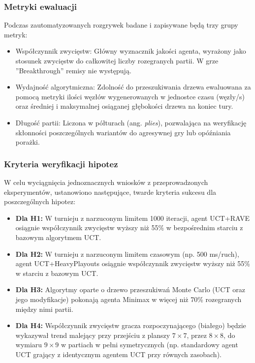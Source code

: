 \documentclass{article}
\begin{document}
\subsubsection{Metryki ewaluacji}
Podczas zautomatyzowanych rozgrywek badane i zapisywane będą trzy grupy metryk:
\begin{itemize}
    \item Współczynnik zwycięstw: Główny wyznacznik jakości agenta, wyrażony jako stosunek zwycięstw do całkowitej liczby rozegranych partii. W grze ''Breakthrough'' remisy nie występują.
    \item Wydajność algorytmiczna: Zdolność do przeszukiwania drzewa ewaluowana za pomocą metryki ilości węzłów wygenerowanych w jednostce czasu (węzły/s) oraz średniej i maksymalnej osiąganej głębokości drzewa na koniec tury.
    \item Długość partii: Liczona w półturach (ang. \textit{plies}), pozwalająca na weryfikację skłonności poszczególnych wariantów do agresywnej gry lub opóźniania porażki.
\end{itemize}

\subsubsection{Kryteria weryfikacji hipotez}
W celu wyciągnięcia jednoznacznych wniosków z przeprowadzonych eksperymentów, ustanowiono następujące, twarde kryteria sukcesu dla poszczególnych hipotez:
\begin{itemize}
    \item \textbf{Dla H1:} W turnieju z narzuconym limitem 1000 iteracji, agent UCT+RAVE osiągnie współczynnik zwycięstw wyższy niż 55\% w bezpośrednim starciu z bazowym algorytmem UCT.
    \item \textbf{Dla H2:} W turnieju z narzuconym limitem czasowym (np. 500 ms/ruch), \\ agent UCT+HeavyPlayouts osiągnie współczynnik zwycięstw wyższy niż 55\% w starciu z bazowym UCT.
    \item \textbf{Dla H3:} Algorytmy oparte o drzewo przeszukiwań Monte Carlo (UCT oraz jego modyfikacje) pokonają agenta Minimax w więcej niż 70\% rozegranych między nimi partii.
    \item \textbf{Dla H4:} Współczynnik zwycięstw gracza rozpoczynającego (białego) będzie wykazywał trend malejący przy przejściu z planszy $7 \times 7$, przez $8 \times 8$, do wymiaru $9 \times 9$ w partiach w pełni symetrycznych (np. standardowy agent UCT grający z identycznym agentem UCT przy równych zasobach).
\end{itemize}
\end{document}

